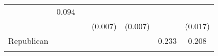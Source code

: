 \documentclass[12pt,twoside]{reedthesis}
\begin{document}
\begin{longtable}[]{@{}ccccccc@{}}
\begin{minipage}[t]{0.11\columnwidth}
  \strut
  \end{minipage} & \begin{minipage}[t]{0.12\columnwidth}\centering\strut
  0.094\strut
  \end{minipage}\tabularnewline
  \begin{minipage}[t]{0.14\columnwidth}\centering\strut
  \strut
  \end{minipage} & \begin{minipage}[t]{0.10\columnwidth}\centering\strut
  \strut
  \end{minipage} & \begin{minipage}[t]{0.11\columnwidth}\centering\strut
  \strut
  \end{minipage} & \begin{minipage}[t]{0.11\columnwidth}\centering\strut
  (0.007)\strut
  \end{minipage} & \begin{minipage}[t]{0.11\columnwidth}\centering\strut
  (0.007)\strut
  \end{minipage} & \begin{minipage}[t]{0.11\columnwidth}\centering\strut
  \strut
  \end{minipage} & \begin{minipage}[t]{0.12\columnwidth}\centering\strut
  (0.017)\strut
  \end{minipage}\tabularnewline
  \begin{minipage}[t]{0.14\columnwidth}\centering\strut
  Republican\strut
  \end{minipage} & \begin{minipage}[t]{0.10\columnwidth}\centering\strut
  \strut
  \end{minipage} & \begin{minipage}[t]{0.11\columnwidth}\centering\strut
  \strut
  \end{minipage} & \begin{minipage}[t]{0.11\columnwidth}\centering\strut
  \strut
  \end{minipage} & \begin{minipage}[t]{0.11\columnwidth}\centering\strut
  \strut
  \end{minipage} & \begin{minipage}[t]{0.11\columnwidth}\centering\strut
  0.233\strut
  \end{minipage} & \begin{minipage}[t]{0.12\columnwidth}\centering\strut
  0.208\strut
  \end{minipage}\tabularnewline
  \begin{minipage}[t]{0.14\columnwidth}\centering\strut

\end{minipage}
\end{longtable}
\end{document}
